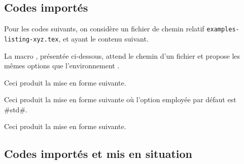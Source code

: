 \documentclass[10pt, a4paper, theme = color]{tutodoc}
\begin{document}
\subsection{Codes importés}

Pour les codes suivants, on considère un fichier de chemin relatif \verb+examples-listing-xyz.tex+, et ayant le contenu suivant.




\medskip


La macro , présentée ci-dessous, attend le chemin d'un fichier et propose les mêmes options que l'environnement .


\begin{tdocexa}
    \leavevmode

    \begin{tdoclatex}[code]
    \end{tdoclatex}

    Ceci produit la mise en forme suivante.

\end{tdocexa}


\begin{tdocexa}[À la suite]
    \leavevmode

    \begin{tdoclatex}[code]
    \end{tdoclatex}

    Ceci produit la mise en forme suivante où l'option employée par défaut est \tdocinlatex#std#.

\end{tdocexa}


\begin{tdocexa}
    \leavevmode

    \begin{tdoclatex}[code]
    \end{tdoclatex}

    Ceci produit la mise en forme suivante.

\end{tdocexa}



\subsection{Codes importés et mis en situation}
\label{tutodoc-latexshow}
\end{document}
